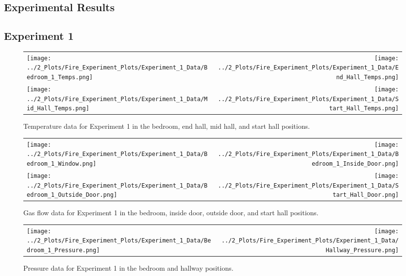 \documentclass[12pt,oneside]{book}
\begin{document}
\begin{appendices}
\section*{Experimental Results} \label{App:Results}

\subsection*{Experiment 1}
\label{app:Experiment_1}

\begin{figure}[!ht]
\begin{tabular*}{\textwidth}{lr}
\texttt{[image: ../2\_Plots/Fire\_Experiment\_Plots/Experiment\_1\_Data/Bedroom\_1\_Temps.png]} &
\texttt{[image: ../2\_Plots/Fire\_Experiment\_Plots/Experiment\_1\_Data/End\_Hall\_Temps.png]} \\
\texttt{[image: ../2\_Plots/Fire\_Experiment\_Plots/Experiment\_1\_Data/Mid\_Hall\_Temps.png]} &
\texttt{[image: ../2\_Plots/Fire\_Experiment\_Plots/Experiment\_1\_Data/Start\_Hall\_Temps.png]} \\
\end{tabular*}
\caption[Experiment 1 Temperatures]{Temperature data for Experiment 1 in the bedroom, end hall, mid hall, and start hall positions.}
\end{figure}

\clearpage

\begin{figure}[!ht]
\begin{tabular*}{\textwidth}{lr}
\texttt{[image: ../2\_Plots/Fire\_Experiment\_Plots/Experiment\_1\_Data/Bedroom\_1\_Window.png]} &
\texttt{[image: ../2\_Plots/Fire\_Experiment\_Plots/Experiment\_1\_Data/Bedroom\_1\_Inside\_Door.png]} \\
\texttt{[image: ../2\_Plots/Fire\_Experiment\_Plots/Experiment\_1\_Data/Bedroom\_1\_Outside\_Door.png]} &
\texttt{[image: ../2\_Plots/Fire\_Experiment\_Plots/Experiment\_1\_Data/Start\_Hall\_Door.png]} \\
\end{tabular*}
\caption[Experiment 1 Gas Flows]{Gas flow data for Experiment 1 in the bedroom, inside door, outside door, and start hall positions.}
\end{figure}

\clearpage

\begin{figure}[!ht]
\begin{tabular*}{\textwidth}{lr}
\texttt{[image: ../2\_Plots/Fire\_Experiment\_Plots/Experiment\_1\_Data/Bedroom\_1\_Pressure.png]} &
\texttt{[image: ../2\_Plots/Fire\_Experiment\_Plots/Experiment\_1\_Data/Hallway\_Pressure.png]} \\
\end{tabular*}
\caption[Experiment 1 Pressures]{Pressure data for Experiment 1 in the bedroom and hallway positions.}
\end{figure}


\end{appendices}
\end{document}
